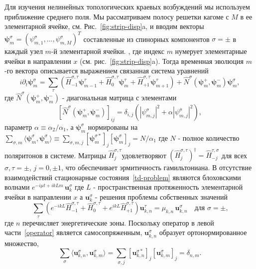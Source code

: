\documentclass[
aps,
prl,
groupedaddress,
superscriptaddress,
floatfix,
notitlepage
]{revtex4-1}
\newcommand{\p}{\partial}
\begin{document}
Для изучения нелинейных топологических краевых возбуждений мы используем приближение среднего поля. Мы рассматриваем полосу решетки кагоме с $M$ в ее элементарной ячейке, см. Рис.~\ref{fig:strip-disp}a, и вводим векторы $\pmb{\psi}_m^{\sigma}=(\psi_{m,1}^{\sigma},...,\psi_{m,M}^{\sigma})^T$ составленные из спинорных компонентов $\sigma=\pm$ в каждый узел $m$-й элементарной ячейки. , где индекс $m$ нумерует элементарные ячейки в направлении $x$ (см. рис.~\ref{fig:strip-disp}a).
Тогда временная эволюция $m$-го вектора описывается выражением
связанная система уравнений
\begin{equation}
i\p_t\pmb{\psi}_m^{\sigma}=\sum_{\tau}\left(\hat H_{-1}^{\sigma,\tau}\pmb{\psi}_{m-1}^{\tau}+\hat H_0^{\sigma,\tau}\pmb{\psi}_m^{\tau}+\hat H_{+1}^{\sigma,\tau}\pmb{\psi}_{m+1}^{\tau}\right)+ \hat{N}^{\sigma}(\pmb{\psi}_m^{+},\pmb{\psi}_m^{-}) \pmb{\psi}_m^{\sigma},
\label{td-problem}
\end{equation} 
где $\hat{N}^{\sigma}(\pmb{\psi}_m^{+},\pmb{\psi}_m^{-})$ - диагональная матрица с элементами
$$\left[\hat{N}^{\sigma}(\pmb{\psi}_m^{+},\pmb{\psi}_m^{-})\right]_{ij} = \delta_{i,j}\left(|\psi_{m,j}^{\sigma}|^2 + \alpha |\psi_{m,j}^{\bar\sigma}|^2\right),$$
параметр $\alpha\equiv \alpha_2/\alpha_1$, а 
$\pmb{\psi}_m^{\sigma}$ нормированы на $\sum_{\sigma,m}\langle\pmb{\psi}_m^{\sigma},\pmb{\psi}_m^{\sigma}\rangle \equiv \sum_{\sigma,m,j}[\pmb{\psi}_m^{\sigma*}]_j [\pmb{\psi}_m^{\sigma}]_j=N/\alpha_1$ 
где $N$ - полное количество поляритонов в системе.
Матрицы $\hat H_{j}^{\sigma,\tau}$удовлетворяют $(\hat H_{j}^{\sigma,\tau})^\dagger=\hat H_{-j}^{\tau,\sigma}$
для всех $\sigma,\tau=\pm$, $j=0,\pm1$, что обеспечивает эрмитичность гамильтониана.
В отсутствие взаимодействий стационарные состояния~\eqref{td-problem} являются блоховскими волнами $e^{-i\mu t+ikLm}\,\pmb{u}_{k}^{\sigma}$ где $L$ - пространственная протяженность элементарной ячейки в направлении $x$ а $\pmb{u}_{k}^{\sigma}$ - %
решения проблемы собственных значений
\begin{equation}
\sum_{\tau}\left(e^{-ikL} \hat H_{-1}^{\sigma,\tau}+\hat H_0^{\sigma,\tau}+e^{ikL} \hat H_{+1}^{\sigma,\tau}\right) \pmb{u}_{k,n}^{\tau}=\mu_{k,n}\,\pmb{u}_{k,n}^{\sigma}
\quad\text{для $\sigma=\pm$,}
\label{operator}
\end{equation}
где $n$ перечисляет энергетические зоны. Поскольку оператор в левой части~\eqref{operator} является самосопряженным, $\pmb{u}_{k,n}^{\sigma}$ образует ортонормированное множество, 
$$
\sum_\sigma\langle\pmb{u}_{k,n}^{\sigma},\pmb{u}_{k,m}^{\sigma}\rangle 
=\sum_{\sigma,j}[\pmb{u}_{k,n}^{\sigma*}]_j[\pmb{u}_{k,m}^{\sigma}]_j=\delta_{n,m}.
$$
\end{document}
